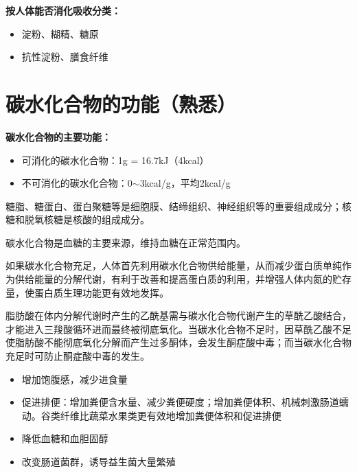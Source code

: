 \begin{tipbox}
\textbf{按人体能否消化吸收分类：}
\begin{itemize}[leftmargin=*]
    \item {}淀粉、糊精、糖原
    \item {}抗性淀粉、膳食纤维
\end{itemize}
\end{tipbox}

\section{碳水化合物的功能（熟悉）}

\begin{tipbox}
\textbf{碳水化合物的主要功能：}

\begin{itemize}[leftmargin=*]
    \item 可消化的碳水化合物：1g = 16.7kJ（4kcal）
    \item 不可消化的碳水化合物：0$\sim$3kcal/g，平均2kcal/g
\end{itemize}

糖脂、糖蛋白、蛋白聚糖等是细胞膜、结缔组织、神经组织等的重要组成成分；核糖和脱氧核糖是核酸的组成成分。

碳水化合物是血糖的主要来源，维持血糖在正常范围内。

如果碳水化合物充足，人体首先利用碳水化合物供给能量，从而减少蛋白质单纯作为供给能量的分解代谢，有利于改善和提高蛋白质的利用，并增强人体内氮的贮存量，使蛋白质生理功能更有效地发挥。

脂肪酸在体内分解代谢时产生的乙酰基需与碳水化合物代谢产生的草酰乙酸结合，才能进入三羧酸循环进而最终被彻底氧化。当碳水化合物不足时，因草酰乙酸不足使脂肪酸不能彻底氧化分解而产生过多酮体，会发生酮症酸中毒；而当碳水化合物充足时可防止酮症酸中毒的发生。

\begin{itemize}[leftmargin=*]
    \item 增加饱腹感，减少进食量
    \item 促进排便：增加粪便含水量、减少粪便硬度；增加粪便体积、机械刺激肠道蠕动。谷类纤维比蔬菜水果类更有效地增加粪便体积和促进排便
    \item 降低血糖和血胆固醇
    \item 改变肠道菌群，诱导益生菌大量繁殖
\end{itemize}
\end{tipbox}

